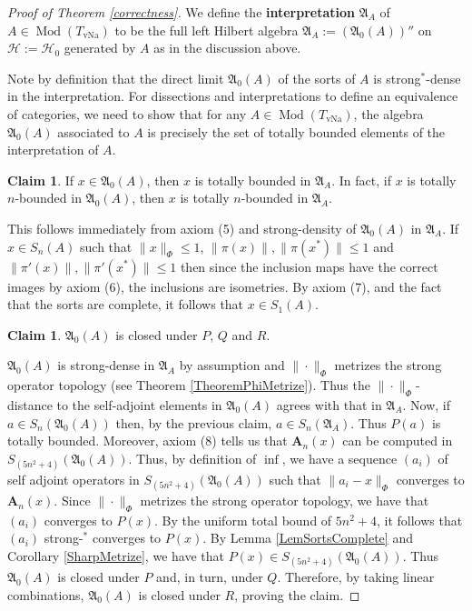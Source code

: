 \documentclass[12pt]{amsart}
\theoremstyle{definition}
\newtheorem{claim}[thm]{Claim}
\def\cal{\mathcal}
\def \Md{\operatorname{Mod}}
\DeclareMathOperator{\vNa}{vNa}
\def \vA{\mathbf{A}}
\begin{document}
\begin{proof}[Proof of Theorem \ref{correctness}]
    We define the \textbf{interpretation} $\mathfrak{A}_{A}$ of $A \in \Md(T_{\vNa})$ to be the full left Hilbert algebra $\mathfrak{A}_{A} := (\mathfrak{A}_0(A)){''}$ on $\cal H := \cal H_0$ generated by $A$ as in the discussion above.

    Note by definition that the direct limit $\mathfrak{A}_0(A)$ of the sorts of $A$ is strong$^*$-dense in the interpretation.  For dissections and interpretations to define an equivalence of categories, we need to show that for any $A \in \Md (T_{\vNa})$, the algebra $\mathfrak{A}_0(A)$ associated to $A$ is precisely the set of totally bounded elements of the interpretation of $A$.

    \begin{claim}
        If $x \in \mathfrak{A}_0(A)$, then $x$ is totally bounded in $\mathfrak{A}_{A}$.  In fact, if $x$ is totally $n$-bounded in $\mathfrak{A}_0(A)$, then $x$ is totally $n$-bounded in $\mathfrak{A}_{A}$.
    \end{claim}

    This follows immediately from axiom (5) and strong-density of $\mathfrak{A}_0(A)$ in $\mathfrak{A}_{A}$.  If $x \in S_n(A)$ such that $\|x\|_{\Phi} \leq 1$, $\|\pi(x)\|, \|\pi(x^*)\| \leq 1$ and $\|\pi'(x)\|, \|\pi'(x^*)\| \leq 1$ then since the inclusion maps have the correct images by axiom (6), the inclusions are isometries.  By axiom (7), and the fact that the sorts are complete, it follows that $x \in S_1(A)$.

    \begin{claim}
        $\mathfrak{A}_0(A)$ is closed under $P$, $Q$ and $R$.
    \end{claim}
    
    $\mathfrak{A}_0(A)$ is strong-dense in $\mathfrak{A}_{A}$ by assumption and $\|\cdot\|_\Phi$ metrizes the strong operator topology (see Theorem \ref{TheoremPhiMetrize}).  Thus the $\|\cdot\|_\Phi$-distance to the self-adjoint elements in $\mathfrak{A}_0(A)$ agrees with that in $\mathfrak{A}_{A}$.  Now, if $a \in S_n(\mathfrak{A}_0(A))$ then, by the previous claim, $a \in S_n(\mathfrak{A}_{A})$.  Thus $P(a)$ is totally bounded.  Moreover, axiom (8) tells us that $\vA_n(x)$ can be computed in $S_{(5n^2+4)}(\mathfrak{A}_0(A))$.  Thus, by definition of $\inf$, we have a sequence $(a_i)$ of self adjoint operators in $S_{(5n^2+4)}(\mathfrak{A}_0(A))$ such that $\|a_i - x\|_\Phi$ converges to $\vA_{n}(x)$.  Since $\|\cdot\|_\Phi$ metrizes the strong operator topology, we have that $(a_i)$ converges to $P(x)$.  By the uniform total bound of $5n^2+4$, it follows that $(a_i)$ strong-$^*$ converges to $P(x)$.  By Lemma \ref{LemSortsComplete} and Corollary \ref{SharpMetrize}, we have that $P(x) \in S_{(5n^2+4)}(\mathfrak{A}_0(A))$.  Thus $\mathfrak{A}_0(A)$ is closed under $P$ and, in turn, under $Q$.  Therefore, by taking linear combinations, $\mathfrak{A}_0(A)$ is closed under $R$, proving the claim.


\end{proof}
\end{document}
